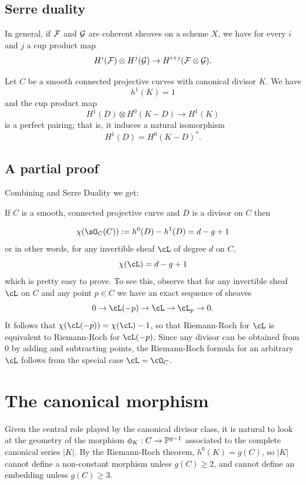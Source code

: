 \subsection{Serre duality}

In general, if $\cF$ and $\cG$ are coherent sheaves on a scheme $X$, we have for every $i$ and $j$ a cup product map
$$
H^i(\cF) \otimes H^j(\cG) \to H^{i+j}(\cF \otimes \cG).
$$

\begin{theorem}\label{sd} Let $C$ be a smooth connected projective curves with canonical divisor $K$. We have
 $$
h^1(K) = 1
$$
and the cup product map
$$
H^1(D) \otimes H^0(K-D) \to H^1(K)
$$
is a perfect pairing; that is, it induces a natural isomorphism
$$
H^1(D) = H^0(K-D)^*.
$$
\end{theorem}

\subsection{A partial proof}

Combining \TRR and Serre Duality we get:
\begin{corollary}
 If $C$ is a smooth, connected projective curve and $D$ is a divisor on $C$ then
\end{corollary}
$$
\chi(\sO_C(C)) := h^0(D) - h^1(D) = d-g+1
$$
or in other words, for any invertible sheaf $\cL$ of degree $d$ on $C$,
$$
\chi(\cL) = d-g+1
$$
which is pretty easy to prove. To see this, observe that for any invertible sheaf $\cL$ on $C$ and any point $p \in C$ we have an exact sequence of sheaves
$$
0 \to \cL(-p) \to \cL \to \cL_p \to 0.
$$
It follows that $\chi(\cL(-p)) = \chi(\cL) - 1$, so that Riemann-Roch for $\cL$ is equivalent to Riemann-Roch for $\cL(-p)$. Since any divisor can be obtained from 0 by adding and subtracting points, the Riemann-Roch formula for an arbitrary $\cL$ follows from the special case $\cL = \cO_C$.


\section{The canonical morphism}

Given the central role played by the canonical divisor class, it is natural to look at the geometry of the morphism $\phi_K : C \to \PP^{g-1}$ associated to the complete canonical series $|K|$.  By the Riemann-Roch theorem, 
$h^{0}(K) = g(C)$, so $|K|$ cannot define a non-constant morphism unless $g(C)\geq 2$, and cannot define an embedding unless $g(C)\geq 3$.

